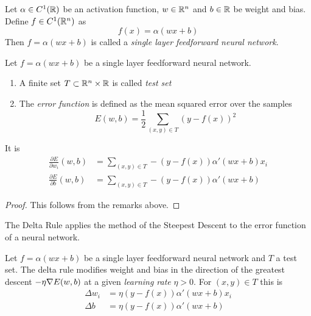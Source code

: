 \begin{definition}
    Let \( \alpha \in C^1(\mathbb{R}) \) be an activation function, \( w \in \mathbb{R}^n \) and \( b \in \mathbb{R} \)
    be weight and bias. Define \( f \in C^1(\mathbb{R}^n) \) as
    \[
        f(x) = \alpha(w x + b)
    \]
    Then \( f = \alpha(wx + b) \) is called a \emph{single layer feedforward neural network}.
\end{definition}
\bigskip


\begin{definition}
    Let \( f = \alpha(wx + b) \) be a single layer feedforward neural network.
    \begin{enumerate}
        \item A finite set \( T \subset \mathbb{R}^n \times \mathbb{R} \) is called  \emph{test set}
        \item The \emph{error function} is defined as the mean squared error over the samples
              \[
                  E(w,b) = \frac{1}{2} \sum_{(x,y) \in T} {(y - f(x))}^2
              \]
    \end{enumerate}
\end{definition}
\bigskip


\begin{lemma}
    It is
    \[
        \begin{split}
            \frac{\partial E}{\partial w_i}(w, b) &= \sum_{(x,y) \in T} - (y - f(x)) \alpha'(wx + b) x_i\\
            \frac{\partial E}{\partial b}(w, b) &= \sum_{(x,y) \in T} - (y - f(x)) \alpha'(wx + b)
        \end{split}
    \]
\end{lemma}

\begin{proof}
    This follows from the remarks above.
\end{proof}
\bigskip

The Delta Rule applies the method of the Steepest Descent to the error function of a neural network.
\bigskip


\begin{algorithm}\label{algo:delta_rule}
    Let \( f = \alpha(wx + b) \) be a single layer feedforward neural network and \( T \) a test set.
    The delta rule modifies weight and bias in the direction of the greatest descent
    \( - \eta \nabla E(w,b) \) at a given \emph{learning rate} \( \eta > 0 \). For \( (x, y) \in T \)
    this is
    \[
        \begin{split}
            \Delta w_i & = \eta (y - f(x)) \alpha'(wx + b) x_i \\
            \Delta b & = \eta (y - f(x)) \alpha'(wx + b)
        \end{split}
    \]
\end{algorithm}
\bigskip


